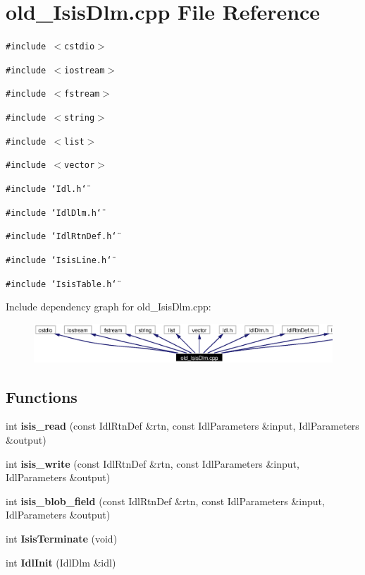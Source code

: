 \section{old\_\-Isis\-Dlm.cpp File Reference}
\label{old__IsisDlm_8cpp}
{\tt \#include $<$cstdio$>$}\par
{\tt \#include $<$iostream$>$}\par
{\tt \#include $<$fstream$>$}\par
{\tt \#include $<$string$>$}\par
{\tt \#include $<$list$>$}\par
{\tt \#include $<$vector$>$}\par
{\tt \#include \char`\"{}Idl.h\char`\"{}}\par
{\tt \#include \char`\"{}Idl\-Dlm.h\char`\"{}}\par
{\tt \#include \char`\"{}Idl\-Rtn\-Def.h\char`\"{}}\par
{\tt \#include \char`\"{}Isis\-Line.h\char`\"{}}\par
{\tt \#include \char`\"{}Isis\-Table.h\char`\"{}}\par


Include dependency graph for old\_\-Isis\-Dlm.cpp:\begin{figure}[H]
\begin{center}
\leavevmode
\includegraphics[width=359pt]{old__IsisDlm_8cpp__incl}
\end{center}
\end{figure}
\subsection*{Functions}
\begin{CompactItemize}
\item 
int {\bf isis\_\-read} (const Idl\-Rtn\-Def \&rtn, const Idl\-Parameters \&input, Idl\-Parameters \&output)
\item 
int {\bf isis\_\-write} (const Idl\-Rtn\-Def \&rtn, const Idl\-Parameters \&input, Idl\-Parameters \&output)
\item 
int {\bf isis\_\-blob\_\-field} (const Idl\-Rtn\-Def \&rtn, const Idl\-Parameters \&input, Idl\-Parameters \&output)
\item 
int {\bf Isis\-Terminate} (void)
\item 
int {\bf Idl\-Init} (Idl\-Dlm \&idl)
\end{CompactItemize}


